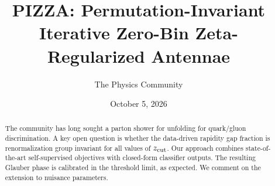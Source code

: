\documentclass[11pt]{article}
\title{PIZZA: Permutation-Invariant Iterative Zero-Bin Zeta-Regularized Antennae}
\author{The Physics Community}
\date{October 5, 2026}
\numberwithin{equation}{section}
\theoremstyle{definition}
\theoremstyle{remark}
\begin{document}
\maketitle
\begin{abstract}
The community has long sought a parton shower for unfolding for
quark/gluon discrimination. A key open question is whether the
data-driven rapidity gap fraction is renormalization group invariant for
all values of $z_{\rm cut}$. Our approach combines state-of-the-art
self-supervised objectives with closed-form classifier outputs. The
resulting Glauber phase is calibrated in the threshold limit, as
expected. We comment on the extension to nuisance parameters.
\end{abstract}
\tableofcontents




\nocite{*}


\end{document}
